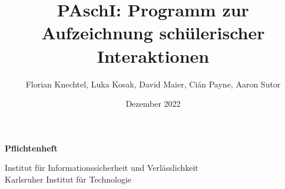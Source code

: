 \documentclass[parskip=full]{scrartcl}
\title{PAschI: Programm zur Aufzeichnung schülerischer Interaktionen}
\author{Florian Knechtel, Luka Kosak, David Maier, Cián Payne, Aaron Sutor}
\date{Dezember 2022}
\begin{document}
\begin{titlepage}
    \begin{center}
        \vspace*{1cm}
        \Huge
        \textbf{\textsc{\@title}}
        \vspace{0.5cm}
        \LARGE
        \vspace{1.5cm}
        
        \textbf{\@author}
        \vspace{2cm}

        \Huge
        \textbf{Pflichtenheft}
        \vfill
        
        
        \Large
        Institut für Informationssicherheit und Verlässlichkeit\\
        Karlsruher Institut für Technologie\\
        \@date
            
    \end{center}
    \setlength{\textheight}{23.5cm}
\end{titlepage}

\setlength{\textheight}{23.5cm}
\tableofcontents
\onehalfspacing





















\printnoidxglossaries
\end{document}
